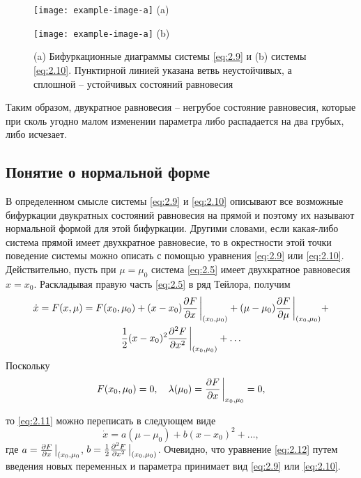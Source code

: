  \begin{figure}[h!]
 	\centering
 	\begin{minipage}{0.49\linewidth}
 		\centering
 		\texttt{[image: example-image-a]}
 		(a)
 		\label{fig:2.6a}
 	\end{minipage}
 	\hfill
 	\begin{minipage}{0.49\linewidth}
 		\centering
 		\texttt{[image: example-image-a]}
 		(b)
 		\label{fig:2.6b}
 	\end{minipage}
 	\caption{ (a) Бифуркационные диаграммы системы \eqref{eq:2.9} и (b) системы \eqref{eq:2.10}. Пунктирной линией указана ветвь неустойчивых, а сплошной -- устойчивых состояний равновесия}
 	\label{fig:2.6}
 	
 \end{figure}

Таким образом, двукратное равновесия -- негрубое состояние равновесия, которые при сколь угодно малом изменении параметра либо распадается на два грубых, либо исчезает.

\subsection{Понятие о нормальной форме} %

В определенном смысле системы \eqref{eq:2.9} и \eqref{eq:2.10} описывают все возможные бифуркации двукратных состояний равновесия на прямой и поэтому их называют нормальной формой для этой бифуркации. Другими словами, если какая-либо система прямой имеет двухкратное равновесие, то в окрестности этой точки поведение системы можно описать с помощью уравнения \eqref{eq:2.9} или \eqref{eq:2.10}. Действительно, пусть при $\mu = \mu_0$ система \eqref{eq:2.5} имеет двухкратное равновесия $x=x_0$. Раскладывая правую часть \eqref{eq:2.5} в ряд Тейлора, получим
\begin{gather}
	\dot x = F(x, \mu) = F(x_0, \mu_0)  + (x-x_0) \pdv{F}{x} \eval_{(x_0,\mu_0)} +
	(\mu- \mu_0)\pdv{F}{\mu} \eval_{(x_0,\mu_0)} + \\ 
	\frac12 (x-x_0)^2 \pdv[2]{F}{x} \eval_{(x_0,\mu_0)} + \dots
	\label{eq:2.11}
\end{gather}
Поскольку
\begin{equation}
	\label{eq:}
	F(x_0, \mu_0) = 0, \quad \lambda(\mu_0) = \pdv{F}{x}\eval_{x_0, \mu_0} = 0 ,
\end{equation}

 то \eqref{eq:2.11} можно переписать в следующем виде
 \begin{equation}
 	\label{eq:2.12}
 	\dot x = a(\mu - \mu_0) + b (x-x_0)^2 + \dots ,
 \end{equation}
 где $a = \pdv{F}{x}\eval_{(x_0, \mu_0} $, $b =\frac12 \pdv[2]{F}{x}\eval_{(x_0, \mu_0)}$.
 Очевидно, что уравнение \eqref{eq:2.12} путем введения новых переменных и параметра принимает вид \eqref{eq:2.9} или \eqref{eq:2.10}.
